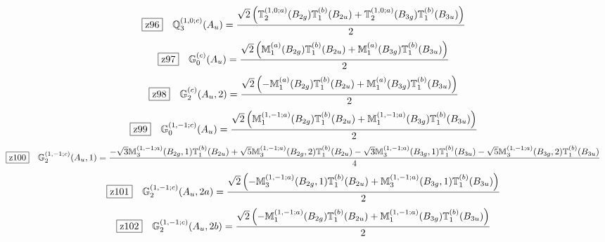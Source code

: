 \documentclass[fleqn,10pt,landscape]{jsarticle}
\begin{document}
\begin{dmath*}
\hspace*{3mm}\fbox{z96}\quad \mathbb{Q}_{3}^{(1,0;c)}(A_{u})=\frac{\sqrt{2} \left(\mathbb{T}_{2}^{(1,0;a)}(B_{2g}) \mathbb{T}_{1}^{(b)}(B_{2u}) + \mathbb{T}_{2}^{(1,0;a)}(B_{3g}) \mathbb{T}_{1}^{(b)}(B_{3u})\right)}{2}
\end{dmath*}
\begin{dmath*}
\hspace*{3mm}\fbox{z97}\quad \mathbb{G}_{0}^{(c)}(A_{u})=\frac{\sqrt{2} \left(\mathbb{M}_{1}^{(a)}(B_{2g}) \mathbb{T}_{1}^{(b)}(B_{2u}) + \mathbb{M}_{1}^{(a)}(B_{3g}) \mathbb{T}_{1}^{(b)}(B_{3u})\right)}{2}
\end{dmath*}
\begin{dmath*}
\hspace*{3mm}\fbox{z98}\quad \mathbb{G}_{2}^{(c)}(A_{u},2)=\frac{\sqrt{2} \left(- \mathbb{M}_{1}^{(a)}(B_{2g}) \mathbb{T}_{1}^{(b)}(B_{2u}) + \mathbb{M}_{1}^{(a)}(B_{3g}) \mathbb{T}_{1}^{(b)}(B_{3u})\right)}{2}
\end{dmath*}
\begin{dmath*}
\hspace*{3mm}\fbox{z99}\quad \mathbb{G}_{0}^{(1,-1;c)}(A_{u})=\frac{\sqrt{2} \left(\mathbb{M}_{1}^{(1,-1;a)}(B_{2g}) \mathbb{T}_{1}^{(b)}(B_{2u}) + \mathbb{M}_{1}^{(1,-1;a)}(B_{3g}) \mathbb{T}_{1}^{(b)}(B_{3u})\right)}{2}
\end{dmath*}
\begin{dmath*}
\hspace*{3mm}\fbox{z100}\quad \mathbb{G}_{2}^{(1,-1;c)}(A_{u},1)=\frac{- \sqrt{3} \mathbb{M}_{3}^{(1,-1;a)}(B_{2g},1) \mathbb{T}_{1}^{(b)}(B_{2u}) + \sqrt{5} \mathbb{M}_{3}^{(1,-1;a)}(B_{2g},2) \mathbb{T}_{1}^{(b)}(B_{2u}) - \sqrt{3} \mathbb{M}_{3}^{(1,-1;a)}(B_{3g},1) \mathbb{T}_{1}^{(b)}(B_{3u}) - \sqrt{5} \mathbb{M}_{3}^{(1,-1;a)}(B_{3g},2) \mathbb{T}_{1}^{(b)}(B_{3u})}{4}
\end{dmath*}
\begin{dmath*}
\hspace*{3mm}\fbox{z101}\quad \mathbb{G}_{2}^{(1,-1;c)}(A_{u},2a)=\frac{\sqrt{2} \left(- \mathbb{M}_{3}^{(1,-1;a)}(B_{2g},1) \mathbb{T}_{1}^{(b)}(B_{2u}) + \mathbb{M}_{3}^{(1,-1;a)}(B_{3g},1) \mathbb{T}_{1}^{(b)}(B_{3u})\right)}{2}
\end{dmath*}
\begin{dmath*}
\hspace*{3mm}\fbox{z102}\quad \mathbb{G}_{2}^{(1,-1;c)}(A_{u},2b)=\frac{\sqrt{2} \left(- \mathbb{M}_{1}^{(1,-1;a)}(B_{2g}) \mathbb{T}_{1}^{(b)}(B_{2u}) + \mathbb{M}_{1}^{(1,-1;a)}(B_{3g}) \mathbb{T}_{1}^{(b)}(B_{3u})\right)}{2}
\end{dmath*}
\end{document}
